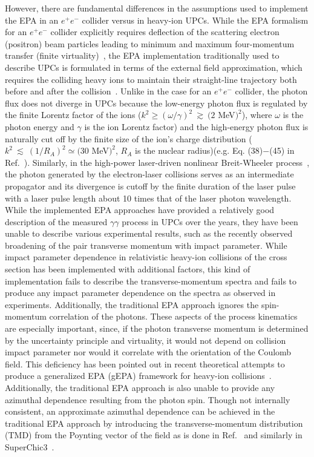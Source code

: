 \documentclass[twocolumn,epjc3]{svjour3}\sloppy
\begin{document}
However, there are fundamental differences in the assumptions used to implement the EPA in an $e^+e^-$ collider versus in heavy-ion UPCs. 
While the EPA formalism for an $e^+e^-$ collider explicitly requires deflection of the scattering electron (positron) beam particles leading to minimum and maximum four-momentum transfer (finite virtuality)~\cite{budnev_two-photon_1975}, the EPA implementation traditionally used to describe UPCs is formulated in terms of the external field approximation, which requires the colliding heavy ions to maintain their straight-line trajectory both before and after the collision~\cite{PhysRevC.47.2308}.
Unlike in the case for an $e^+e^-$ collider, the photon flux does not diverge in UPCs because the low-energy photon flux is regulated by the finite Lorentz factor of the ions ($k^2 \ge (\omega/\gamma)^2~ \gtrsim ~(2$ MeV$)^2$), where $\omega$ is the photon energy and $\gamma$ is the ion Lorentz factor) and the high-energy photon flux is naturally cut off by the finite size of the ion's charge distribution ($k^2~\lesssim~(1/R_A)^2 \simeq (30$ MeV$)^2$, $R_A$ is the nuclear radius)(e.g. Eq. (38)$-$(45) in Ref.~\cite{PhysRevC.47.2308}). 
Similarly, in the high-power laser-driven nonlinear Breit-Wheeler process~\cite{SLACPhysRevLett.79.1626}, the photon generated by the electron-laser collisions serves as an intermediate propagator and its divergence is cutoff by the finite duration of the laser pulse~\cite{SLACTridentQEDPRL2010} with a laser pulse length about 10 times that of the laser photon wavelength.
While the implemented EPA approaches have provided a relatively good description of the measured $\gamma\gamma$ process in UPCs over the years, they have been unable to describe various experimental results, such as the recently observed broadening of the pair transverse momentum with impact parameter. 
While impact parameter dependence in relativistic heavy-ion collisions of the cross section has been implemented with additional factors, this kind of implementation fails to describe the transverse-momentum spectra and fails to produce any impact parameter dependence on the spectra as observed in experiments. 
Additionally, the traditional EPA approach ignores the spin-momentum correlation of the photons. 
These aspects of the process kinematics are especially important, since, if the photon transverse momentum is determined by the uncertainty principle and virtuality, it would not depend on collision impact parameter nor would it correlate with the orientation of the Coulomb field. 
This deficiency has been pointed out in recent theoretical attempts to produce a generalized EPA (gEPA) framework for heavy-ion collisions~\cite{hencken_electromagnetic_1994,zhaInitialTransversemomentumBroadening2020b}. Additionally, the traditional EPA approach is also unable to provide any azimuthal dependence resulting from the photon spin.
Though not internally consistent, an approximate azimuthal dependence can be achieved in the traditional EPA approach by introducing the transverse-momentum distribution (TMD) from the Poynting vector of the field as is done in Ref.~\cite{liProbingLinearPolarization2019} and similarly in SuperChic3~\cite{SuperChic3}.
\end{document}
